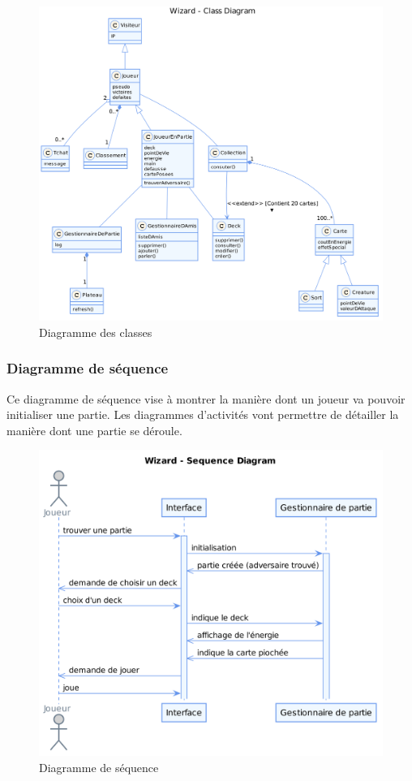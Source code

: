 \documentclass[11pt,a4paper]{article}
\begin{document}
\begin{figure}[ht]
  \centering
  \includegraphics[width=1\textwidth]{../uml_files/ClassDiagram.png}
  \caption{\label{fig:class} Diagramme des classes}
\end{figure}

\subsubsection{Diagramme de séquence}
Ce diagramme de séquence vise à montrer la manière dont un joueur va pouvoir initialiser une partie.  Les diagrammes d'activités vont permettre de détailler la manière dont une partie se déroule.
\begin{figure}[ht]
  \centering
  \includegraphics[width=1\textwidth]{../uml_files/SequenceDiagram.png}
  \caption{\label{fig:seq} Diagramme de séquence}
\end{figure}
\end{document}
